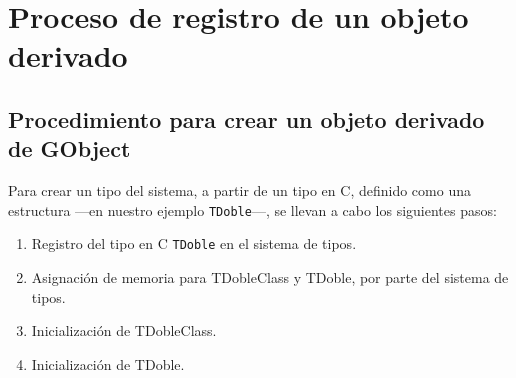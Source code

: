 %

\section{Proceso de registro de un objeto derivado}
\subsection{Procedimiento para crear un objeto derivado de \textsf{GObject}}
Para crear un tipo del sistema, a partir de un tipo en C, definido como una estructura ---en nuestro
ejemplo \texttt{TDoble}---, se llevan a cabo los siguientes pasos:
\begin{enumerate}
  \tightlist
\item Registro del tipo en C \texttt{TDoble} en el sistema de tipos.
\item Asignación de memoria para \textsf{TDobleClass} y \textsf{TDoble}, por parte del sistema de tipos.
\item Inicialización de \textsf{TDobleClass}.
\item Inicialización de \textsf{TDoble}.
\end{enumerate}


